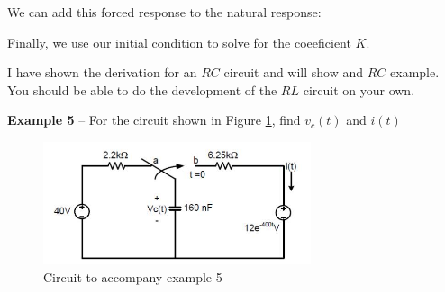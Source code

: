 \documentclass{handout}
\begin{document}
We can add this forced response to the natural response:
\soln{1in}{
\[
v(t) = Ke^{-\frac{t}{RC}}+\frac{ V_A}{ \left[1-RC\alpha\right]}e^{-\alpha t}
\]
}

Finally, we use our initial condition to solve for the coeeficient $K$.

I have shown the derivation for an $RC$ circuit and will show and $RC$ example.  You should be able to do the development of the $RL$ circuit on your own.

\newpage
\clearpage
\pagebreak

\textbf{Example 5} -- For the circuit shown in Figure \ref{fig: Example5}, find $v_c(t)$ and $i(t)$

\begin{figure} [h!]
\centering
\includegraphics[width=0.7\textwidth]{Example5.jpg}
\caption{Circuit to accompany example 5}
\label{fig: Example5}
\end{figure}
 
\end{document}
